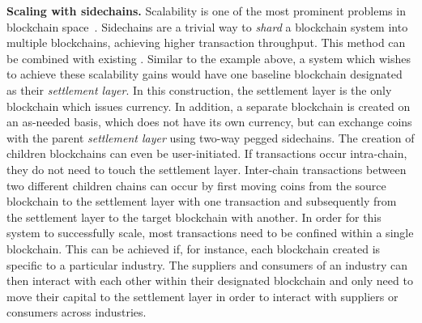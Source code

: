 \noindent
\textbf{Scaling with sidechains. } Scalability is one of the most prominent
problems in blockchain space~\cite{bitcoinng,sompolinsky2013accelerating}.
Sidechains are a trivial way to \emph{shard} a blockchain system into multiple
blockchains, achieving higher transaction throughput. This method can be
combined with existing . Similar to the example
above, a system which wishes to achieve these scalability gains would have one
baseline blockchain designated as their \emph{settlement layer}. In this
construction, the settlement layer is the only blockchain which issues currency.
In addition, a separate blockchain is created on an as-needed basis, which does
not have its own currency, but can exchange coins with the parent
\emph{settlement layer} using two-way pegged sidechains. The creation of children
blockchains can even be user-initiated. If transactions occur intra-chain, they
do not need to touch the settlement layer. Inter-chain transactions between two
different children chains can occur by first moving coins from the source
blockchain to the settlement layer with one transaction and subsequently from
the settlement layer to the target blockchain with another. In order for this
system to successfully scale, most transactions need to be confined within a
single blockchain. This can be achieved if, for instance, each blockchain
created is specific to a particular industry. The suppliers and consumers of an
industry can then interact with each other within their designated blockchain
and only need to move their capital to the settlement layer in order to interact
with suppliers or consumers across industries.

